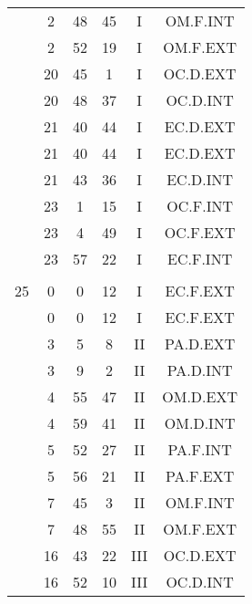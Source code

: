\documentclass[12pt, a4paper]{article}
\begin{document}
\begin{multicols}{3}
{\begin{tabular}{c c c c c c}
	 	 	 	 & 2 & 48 & 45 & I & OM.F.INT\\%
	 	 	 	 & 2 & 52 & 19 & I & OM.F.EXT\\%
	 	 	 	 & 20 & 45 & 1 & I & OC.D.EXT\\%
	 	 	 	 & 20 & 48 & 37 & I & OC.D.INT\\%
	 	 	 	 & 21 & 40 & 44 & I & EC.D.EXT\\%
	 	 	 	 & 21 & 40 & 44 & I & EC.D.EXT\\%
	 	 	 	 & 21 & 43 & 36 & I & EC.D.INT\\%
	 	 	 	 & 23 & 1 & 15 & I & OC.F.INT\\%
	 	 	 	 & 23 & 4 & 49 & I & OC.F.EXT\\%
	 	 	 	 & 23 & 57 & 22 & I & EC.F.INT\\%
	 	 	 	 & & & & & \\%
	 	 	 	25 & 0 & 0 & 12 & I & EC.F.EXT\\%
	 	 	 	 & 0 & 0 & 12 & I & EC.F.EXT\\%
	 	 	 	 & 3 & 5 & 8 & II & PA.D.EXT\\%
	 	 	 	 & 3 & 9 & 2 & II & PA.D.INT\\%
	 	 	 	 & 4 & 55 & 47 & II & OM.D.EXT\\%
	 	 	 	 & 4 & 59 & 41 & II & OM.D.INT\\%
	 	 	 	 & 5 & 52 & 27 & II & PA.F.INT\\%
	 	 	 	 & 5 & 56 & 21 & II & PA.F.EXT\\%
	 	 	 	 & 7 & 45 & 3 & II & OM.F.INT\\%
	 	 	 	 & 7 & 48 & 55 & II & OM.F.EXT\\%
	 	 	 	 & 16 & 43 & 22 & III & OC.D.EXT\\%
	 	 	 	 & 16 & 52 & 10 & III & OC.D.INT\\%

\end{tabular}}
\end{multicols}
\end{document}
